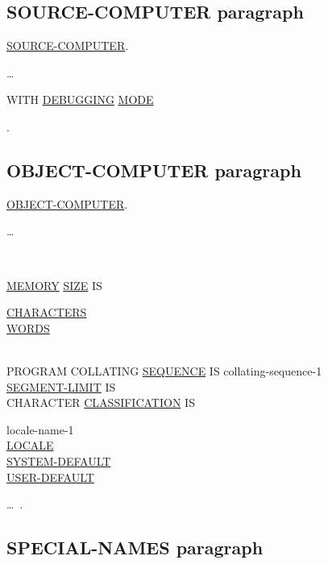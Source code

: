 \documentclass[a4paper,oneside,svgnames]{scrbook}
\makeatletter
\newcommand{\key}[1]{\underline{#1}}
\newcommand{\deleted}[1]{%
  \colorbox{red!75}{#1}}
\newcommand{\gnucobol}[1]{%
  \colorbox{orange!75}{#1}}
\newenvironment{0-1}{$\left[ \begin{tabular}{@{}l@{}}}{\end{tabular} \right]$}
\newenvironment{1=}{$\left\{ \begin{tabular}{@{}l@{}}}{\end{tabular} \right\}$}
\makeatother
\begin{document}
\subsection{SOURCE-COMPUTER paragraph}

\key{SOURCE-COMPUTER}.
\begin{0-1}
  \begin{1=}
    \computername
  \end{1=}\gnucobol{\ldots}
  \deleted{
    \begin{0-1}
      WITH \key{DEBUGGING} \key{MODE}
    \end{0-1}
  }
  .
\end{0-1}

\subsection{OBJECT-COMPUTER paragraph}
\key{OBJECT-COMPUTER}.

\begin{0-1}
  \begin{0-1}
    \begin{1=}
      \computername
    \end{1=}\gnucobol{\ldots}
  \end{0-1}\\\quad
  \begin{0-1}
    \deleted{
      \key{MEMORY} \key{SIZE} IS \integer
      \begin{1=}
        \key{CHARACTERS} \\
        \key{WORDS}
      \end{1=}
    } \\
    PROGRAM COLLATING \key{SEQUENCE} IS collating-sequence-1 \\
    \deleted{\key{SEGMENT-LIMIT} IS \integer} \\
    CHARACTER \key{CLASSIFICATION} IS
    \begin{1=}
      locale-name-1 \\
      \key{LOCALE} \\
      \key{SYSTEM-DEFAULT} \\
      \key{USER-DEFAULT}
    \end{1=}
  \end{0-1}\ldots\ {}.
\end{0-1}

\subsection{SPECIAL-NAMES paragraph}
\end{document}
